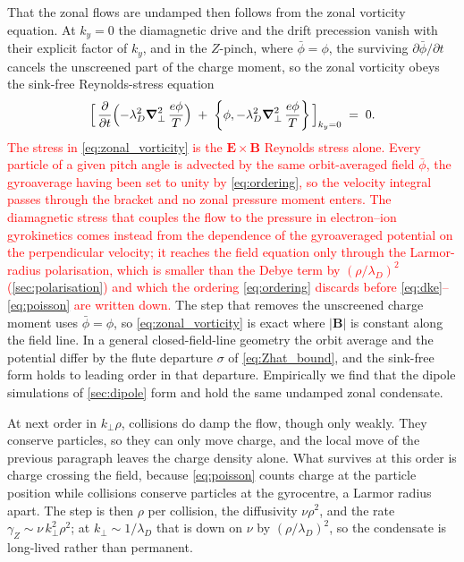 \documentclass{jpp}
\newcommand{\bB}{\mathbf{B}}
\renewcommand{\vec}[1]{\boldsymbol{#1}}
\newcommand{\vec}[1]{\boldsymbol{#1}}
\newcommand{\grad}{{\vec{\nabla}}}
\newcommand{\kperp}{k_\perp}
\newcommand{\pbra}[2]{\left\lbrace #1, #2 \right\rbrace}
\newcommand{\vE}{\vec{E}}
\newcommand{\vB}{\vec{B}}
\newcommand{\lambdaD}{\lambda_D}
\begin{document}
That the zonal flows are undamped then follows from the zonal vorticity equation. At $k_y = 0$ the diamagnetic drive and the drift precession vanish with their explicit factor of $k_y$, and in the $Z$-pinch, where $\bar\phi = \phi$, the surviving $\partial\bar\phi/\partial t$ cancels the unscreened part of the charge moment, so the zonal vorticity obeys the sink-free Reynolds-stress equation
\begin{equation}\label{eq:zonal_vorticity}
\Bigl[\,\frac{\partial}{\partial t}\Bigl(-\lambdaD^2\grad_\perp^2\,\frac{e\phi}{T}\Bigr)
\;+\; \pbra{\phi}{-\lambdaD^2\grad_\perp^2\,\frac{e\phi}{T}}\,\Bigr]_{k_y=0} \;=\; 0 .
\end{equation}
\textcolor{red}{The stress in \cref{eq:zonal_vorticity} is the $\vE \times \vB$ Reynolds stress alone. Every particle of a given pitch angle is advected by the same orbit-averaged field $\bar\phi$, the gyroaverage having been set to unity by \cref{eq:ordering}, so the velocity integral passes through the bracket and no zonal pressure moment enters. The diamagnetic stress that couples the flow to the pressure in electron--ion gyrokinetics comes instead from the dependence of the gyroaveraged potential on the perpendicular velocity; it reaches the field equation only through the Larmor-radius polarisation, which is smaller than the Debye term by $(\rho/\lambdaD)^2$ (\cref{sec:polarisation}) and which the ordering \cref{eq:ordering} discards before \cref{eq:dke}--\cref{eq:poisson} are written down.} The step that removes the unscreened charge moment uses $\bar\phi = \phi$, so \cref{eq:zonal_vorticity} is exact where $|\bB|$ is constant along the field line. In a general closed-field-line geometry the orbit average and the potential differ by the flute departure $\sigma$ of \cref{eq:Zhat_bound}, and the sink-free form holds to leading order in that departure. Empirically we find that the dipole simulations of \cref{sec:dipole} form and hold the same undamped zonal condensate. 

At next order in $\kperp\rho$, collisions do damp the flow, though only weakly. They conserve particles, so they can only move charge, and the local move of the previous paragraph leaves the charge density alone. What survives at this order is charge crossing the field, because \cref{eq:poisson} counts charge at the particle position while collisions conserve particles at the gyrocentre, a Larmor radius apart. The step is then $\rho$ per collision, the diffusivity $\nu\rho^2$, and the rate $\gamma_Z \sim \nu\,\kperp^2\rho^2$; at $\kperp \sim 1/\lambdaD$ that is down on $\nu$ by $(\rho/\lambdaD)^2$, so the condensate is long-lived rather than permanent.
\end{document}
